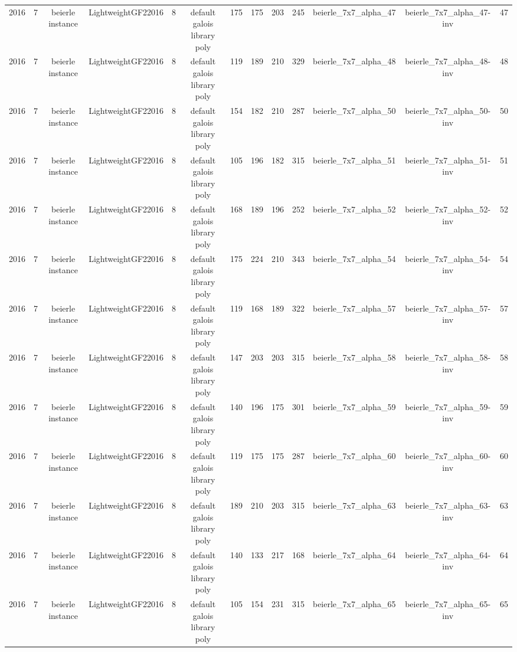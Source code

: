 \begin{tabular}{c c c c c c c c c c c c c}
2016 & 7 & beierle instance & LightweightGF22016 & 8 & default galois library poly & 175 & 175 & 203 & 245 & beierle_7x7_alpha_47 & beierle_7x7_alpha_47-inv & 47 \\
2016 & 7 & beierle instance & LightweightGF22016 & 8 & default galois library poly & 119 & 189 & 210 & 329 & beierle_7x7_alpha_48 & beierle_7x7_alpha_48-inv & 48 \\
2016 & 7 & beierle instance & LightweightGF22016 & 8 & default galois library poly & 154 & 182 & 210 & 287 & beierle_7x7_alpha_50 & beierle_7x7_alpha_50-inv & 50 \\
2016 & 7 & beierle instance & LightweightGF22016 & 8 & default galois library poly & 105 & 196 & 182 & 315 & beierle_7x7_alpha_51 & beierle_7x7_alpha_51-inv & 51 \\
2016 & 7 & beierle instance & LightweightGF22016 & 8 & default galois library poly & 168 & 189 & 196 & 252 & beierle_7x7_alpha_52 & beierle_7x7_alpha_52-inv & 52 \\
2016 & 7 & beierle instance & LightweightGF22016 & 8 & default galois library poly & 175 & 224 & 210 & 343 & beierle_7x7_alpha_54 & beierle_7x7_alpha_54-inv & 54 \\
2016 & 7 & beierle instance & LightweightGF22016 & 8 & default galois library poly & 119 & 168 & 189 & 322 & beierle_7x7_alpha_57 & beierle_7x7_alpha_57-inv & 57 \\
2016 & 7 & beierle instance & LightweightGF22016 & 8 & default galois library poly & 147 & 203 & 203 & 315 & beierle_7x7_alpha_58 & beierle_7x7_alpha_58-inv & 58 \\
2016 & 7 & beierle instance & LightweightGF22016 & 8 & default galois library poly & 140 & 196 & 175 & 301 & beierle_7x7_alpha_59 & beierle_7x7_alpha_59-inv & 59 \\
2016 & 7 & beierle instance & LightweightGF22016 & 8 & default galois library poly & 119 & 175 & 175 & 287 & beierle_7x7_alpha_60 & beierle_7x7_alpha_60-inv & 60 \\
2016 & 7 & beierle instance & LightweightGF22016 & 8 & default galois library poly & 189 & 210 & 203 & 315 & beierle_7x7_alpha_63 & beierle_7x7_alpha_63-inv & 63 \\
2016 & 7 & beierle instance & LightweightGF22016 & 8 & default galois library poly & 140 & 133 & 217 & 168 & beierle_7x7_alpha_64 & beierle_7x7_alpha_64-inv & 64 \\
2016 & 7 & beierle instance & LightweightGF22016 & 8 & default galois library poly & 105 & 154 & 231 & 315 & beierle_7x7_alpha_65 & beierle_7x7_alpha_65-inv & 65 \\

\end{tabular}
